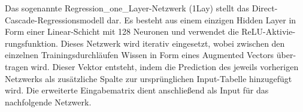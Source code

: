 Das sogenannte Regression\_one\_Layer-Netzwerk (1Lay) stellt das Direct-Cascade-Regressionsmodell dar. Es besteht aus einem einzigen Hidden 
Layer in Form einer 
Linear-Schicht mit 128 Neuronen und verwendet die ReLU-Aktivie-rungsfunktion. Dieses Netzwerk wird iterativ eingesetzt, wobei zwischen den 
einzelnen Trainingsdurchläufen Wissen in Form eines Augmented Vectors über-tragen wird. Dieser Vektor entsteht, indem die Prediction des 
jeweils vorherigen Netzwerks als zusätzliche Spalte zur ursprünglichen Input-Tabelle hinzugefügt wird. Die erweiterte Eingabematrix dient 
anschließend als Input für das nachfolgende Netzwerk.
